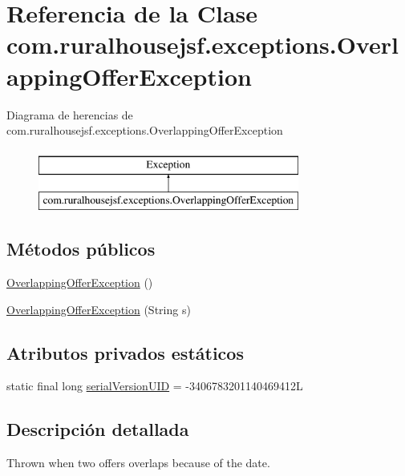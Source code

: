 \hypertarget{classcom_1_1ruralhousejsf_1_1exceptions_1_1_overlapping_offer_exception}{}\section{Referencia de la Clase com.\+ruralhousejsf.\+exceptions.\+Overlapping\+Offer\+Exception}
\label{classcom_1_1ruralhousejsf_1_1exceptions_1_1_overlapping_offer_exception}
Diagrama de herencias de com.\+ruralhousejsf.\+exceptions.\+Overlapping\+Offer\+Exception\begin{figure}[H]
\begin{center}
\leavevmode
\includegraphics[height=2.000000cm]{dd/d98/classcom_1_1ruralhousejsf_1_1exceptions_1_1_overlapping_offer_exception}
\end{center}
\end{figure}
\subsection*{Métodos públicos}
\begin{DoxyCompactItemize}
\item 
\mbox{\hyperlink{classcom_1_1ruralhousejsf_1_1exceptions_1_1_overlapping_offer_exception_a2386ba3955f5299aeb00c053d4f831fb}{Overlapping\+Offer\+Exception}} ()
\item 
\mbox{\hyperlink{classcom_1_1ruralhousejsf_1_1exceptions_1_1_overlapping_offer_exception_a7961de1dd207f4d451ba28b8b343a283}{Overlapping\+Offer\+Exception}} (String s)
\end{DoxyCompactItemize}
\subsection*{Atributos privados estáticos}
\begin{DoxyCompactItemize}
\item 
static final long \mbox{\hyperlink{classcom_1_1ruralhousejsf_1_1exceptions_1_1_overlapping_offer_exception_aaff379d27ee36188b92cd4ed2ee2010e}{serial\+Version\+U\+ID}} = -\/3406783201140469412L
\end{DoxyCompactItemize}


\subsection{Descripción detallada}
Thrown when two offers overlaps because of the date. 

